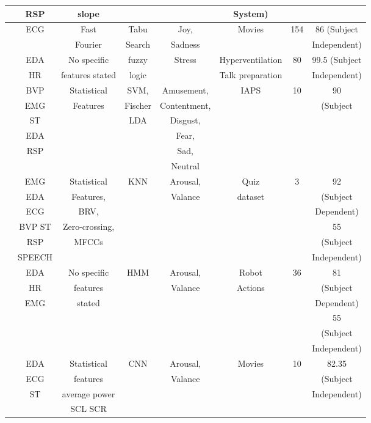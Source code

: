 \begin{center}
{\begin{tabular}{ |c|c|c|c|c|c|c|c| }
& RSP & slope & & & System) & & \\
\hline
\multirow{2}{2em}{\cite{wan_wen_2009}} & ECG & Fast & Tabu & Joy, & Movies & 154 & 86 (Subject \\
& & Fourier & Search & Sadness & & & Independent) \\
\hline
\multirow{2}{2em}{\cite{de_santos_sierra_stress-detection_2011}} & EDA & No specific & fuzzy & Stress & Hyperventilation & 80 & 99.5 (Subject \\
& HR & features stated & logic & & Talk preparation & & Independent) \\
\hline
\multirow{6}{2em}{\cite{kordic_emotion_2010}} & BVP & Statistical & SVM, & Amusement, & IAPS & 10 & 90 \\
& EMG & Features & Fischer & Contentment, & & & (Subject \\
& ST & & LDA & Disgust, & & & \\
& EDA & & & Fear, & & & \\
& RSP & & & Sad, & & & \\
& & & & Neutral & & & \\
\hline
\multirow{6}{2em}{\cite{grimm_bimodal_2007}} & EMG & Statistical & KNN & Arousal, & Quiz & 3 & 92 \\
& EDA & Features, & & Valance & dataset & & (Subject \\
& ECG & BRV, & & & & & Dependent) \\
& BVP ST & Zero-crossing, & & & & & 55 \\
& RSP & MFCCs & & & & & (Subject \\
& SPEECH & & & & & & Independent) \\
\hline
\multirow{6}{2em}{\cite{kulic_affective_2007}} & EDA & No specific & HMM & Arousal, & Robot & 36 & 81  \\
& HR & features & & Valance & Actions & & (Subject \\
& EMG & stated & & & & & Dependent) \\
& & & & & & & 55\\
& & & & & & &  (Subject \\
& & & & & & & Independent)\\
\hline
\multirow{4}{2em}{\cite{schulze_cnn_2016}} & EDA & Statistical & CNN & Arousal, & Movies & 10 & 82.35 \\
& ECG & features & & Valance & & & (Subject \\
& ST & average power & & & & & Independent) \\
& & SCL SCR & & & & & \\

\end{tabular}}
\end{center}
